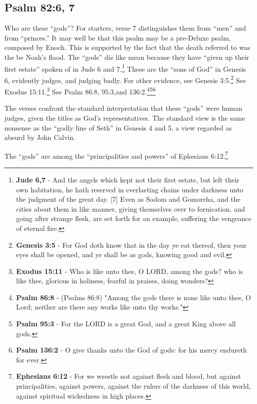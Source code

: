 \subsection{Psalm 82:6, 7}
Who are these ``gods''? For starters, verse 7 distinguishes them from ``men'' and from ``princes.'' It may well be that this psalm may be a pre-Deluxe psalm, composed by Enoch. This is supported by the fact that the death referred to was the be Noah's flood. The ``gods'' die like mean because they have ``given up their first estate'' spoken of in Jude 6 and 7.\footnote{\textbf{Jude 6,7} - And the angels which kept not their first estate, but left their own habitation, he hath reserved in everlasting chains under darkness unto the judgment of the great day. [7] Even as Sodom and Gomorrha, and the cities about them in like manner, giving themselves over to fornication, and going after strange flesh, are set forth for an example, suffering the vengeance of eternal fire.} These are the ``sons of God'' in Genesis 6, evidently judges, and judging badly. For other evidence, see Genesis 3:5.\footnote{\textbf{Genesis 3:5} - For God doth know that in the day ye eat thereof, then your eyes shall be opened, and ye shall be as gods, knowing good and evil.} See Exodus 15:11.\footnote{\textbf{Exodus 15:11} - Who is like unto thee, O LORD, among the gods? who is like thee, glorious in holiness, fearful in praises, doing wonders?} See Psalm 86:8, 95:3,and 136:2.\footnote{\textbf{Psalm 86:8} - (Psalms 86:8) "Among the gods there is none like unto thee, O Lord; neither are there any works like unto thy works."}\footnote{\textbf{Psalm 95:3} - For the LORD is a great God, and a great King above all gods.}\footnote{\textbf{Psalm 136:2} - O give thanks unto the God of gods: for his mercy endureth for ever.}

The verses confront the standard interpretation that these ``gods'' were human judges, given the titles as God's representatives. The standard view is the same nonsense as the ``godly line of Seth'' in Genesis 4 and 5, a view regarded as absurd by John Calvin.

The ``gods'' are among the ``principalities and powers'' of Ephesians 6:12.\footnote{\textbf{Ephesians 6:12} - For we wrestle not against flesh and blood, but against principalities, against powers, against the rulers of the darkness of this world, against spiritual wickedness in high places.}

